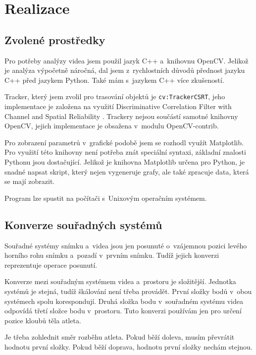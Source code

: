 \chapter{Realizace}

\section{Zvolené prostředky}
\label{sec:prostredky}

Pro potřeby analýzy videa jsem použil jazyk C++ a~knihovnu OpenCV. Jelikož je analýza výpočetně náročná, dal jsem z~rychlostních důvodů přednost jazyku C++ před jazykem Python. Také mám s~jazykem C++ více zkušeností.

Tracker, který jsem zvolil pro trasování objektů je \texttt{cv\::TrackerCSRT}, jeho implementace je založena na využití Discriminative Correlation Filter with Channel and Spatial Reliability \citep{DCFwCaSR}. Trackery nejsou součástí samotné knihovny OpenCV, jejich implementace je obsažena v~modulu OpenCV-contrib.

Pro zobrazení parametrů v~grafické podobě jsem se rozhodl využít Matplotlib. Pro využití této knihovny není potřeba znát speciální syntaxi, základní znalosti Pythonu jsou dostačující. Jelikož je knihovna Matplotlib určena pro Python, je snadné napsat skript, který nejen vygeneruje grafy, ale také zpracuje data, která se mají zobrazit.

Program lze spustit na počítači s~Unixovým operačním systémem.




\section{Konverze souřadných systémů}
\label{sec:konverze}

Souřadné systémy snímku a~videa jsou jen posunuté o~vzájemnou pozici levého horního rohu snímku a~pozadí v~prvním snímku. Tudíž jejich konverzi reprezentuje operace posunutí.

Konverze mezi souřadným systémem videa a~prostoru je složitější. Jednotka systémů je stejná, tudíž škálování není třeba provádět. První složky bodů v~obou systémech spolu korespondují. Druhá složka bodu v~souřadném systému videa odpovídá třetí složce bodu v~prostoru. Tuto konverzi používám jen pro určení pozice kloubů těla atleta.

Je třeba zohlednit směr rozběhu atleta. Pokud běží doleva, musím převrátit hodnotu první složky. Pokud běží doprava, hodnotu první složky nechám stejnou.


